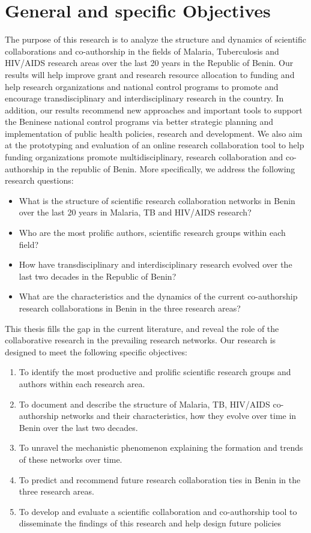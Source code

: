 \section{General and specific Objectives}
The purpose of this research is to analyze the structure and dynamics of scientific collaborations and co-authorship in the fields of Malaria, Tuberculosis and HIV/AIDS research areas over the last 20 years in the Republic of Benin. Our results will help improve grant and research resource allocation to funding and help research organizations and national control programs to promote and encourage transdisciplinary and interdisciplinary research in the country. In addition, our results recommend new approaches and important tools to support the Beninese national control programs via better strategic planning and implementation of public health policies, research and development. We also aim at the prototyping and evaluation of an online research collaboration tool to help funding organizations promote multidisciplinary, research collaboration and co-authorship in the republic of Benin. More specifically, we address the following research questions:
\begin{itemize}
	\item What is the structure of scientific research collaboration networks in Benin over the last 20 years in Malaria, TB and HIV/AIDS research?
	\item Who are the most prolific authors, scientific research groups within each field?
	\item How have transdisciplinary and interdisciplinary research evolved over the last two decades in the Republic of Benin?
	\item What are the characteristics and the dynamics of the current co-authorship research collaborations in Benin in the three research areas?
\end{itemize}
This thesis fills the gap in the current literature, and reveal the role of the collaborative research in the prevailing research networks. Our research is designed to meet the following specific objectives:
\begin{enumerate}
	\item To identify the most productive and prolific scientific research groups and authors within each research area.
	\item To document and describe the structure of Malaria, TB, HIV/AIDS co-authorship networks and their characteristics, how they evolve over time in Benin over the last two decades.
	\item To unravel the mechanistic phenomenon explaining the formation and trends of these networks over time.
	\item To predict and recommend future research collaboration ties in Benin in the three research areas.
	\item To develop and evaluate a scientific collaboration and co-authorship tool to disseminate the findings of this research and help design future policies
\end{enumerate}	

